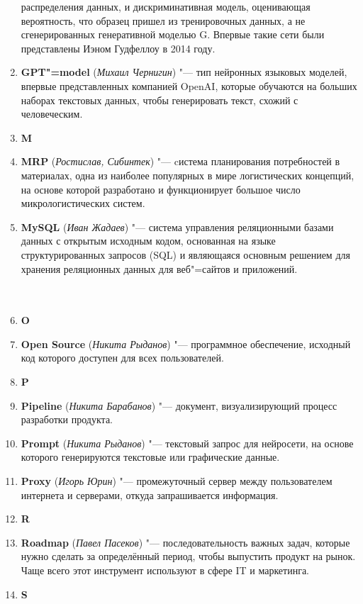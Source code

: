 \documentclass[a4paper, 14 pt]{extarticle}
\begin{document}
\begin{enumerate}
    распределения данных, и дискриминативная модель, оценивающая вероятность, 
    что образец пришел из тренировочных данных, а не сгенерированных 
    генеративной моделью G. Впервые такие сети были представлены Иэном Гудфеллоу
    в 2014 году.
    \item \textbf{GPT"=model} (\textit{Михаил Чернигин}) "--- тип нейронных
    языковых моделей, впервые представленных компанией OpenAI, которые обучаются
    на больших наборах текстовых данных, чтобы генерировать текст, схожий с 
    человеческим.
    \item[] \textbf{M}
    \item \textbf{MRP} (\textit{Ростислав, Сибинтек}) "--- cистема планирования 
    потребностей в материалах, одна из наиболее популярных в мире логистических 
    концепций, на основе которой разработано и функционирует большое число 
    микрологистических систем.
    \item \textbf{MySQL} (\textit{Иван Жадаев}) "--- система управления 
    реляционными базами данных с открытым исходным кодом, основанная на языке 
    структурированных запросов (SQL) и являющаяся основным решением для хранения 
    реляционных данных для веб"=сайтов и приложений. \\
    \\
    \\
    \item[] \textbf{O}
    \item \textbf{Open Source} (\textit{Никита Рыданов}) "--- программное 
    обеспечение, исходный код которого доступен для всех пользователей.
    \item[] \textbf{P}
    \item \textbf{Pipeline} (\textit{Никита Барабанов}) "--- документ, 
    визуализирующий процесс разработки продукта. 
    \item \textbf{Prompt} (\textit{Никита Рыданов}) "--- текстовый запрос для 
    нейросети, на основе которого генерируются текстовые или графические данные.
    \item \textbf{Proxy} (\textit{Игорь Юрин}) "--- промежуточный сервер между 
    пользователем интернета и серверами, откуда запрашивается информация. 
    \item[] \textbf{R}
    \item \textbf{Roadmap} (\textit{Павел Пасеков}) "--- последовательность 
    важных задач, которые нужно сделать за определённый период, чтобы выпустить 
    продукт на рынок. Чаще всего этот инструмент используют в сфере IT и 
    маркетинга. 
    \item[] \textbf{S}

\end{enumerate}
\end{document}
